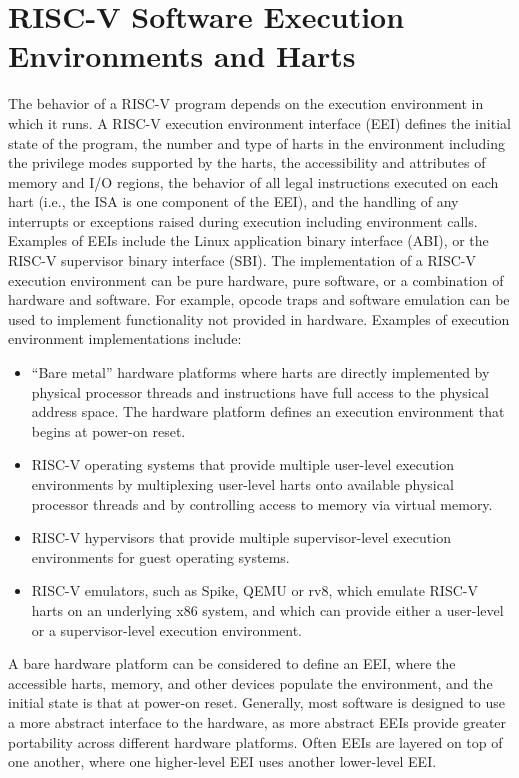 \section{RISC-V Software Execution Environments and Harts}

The behavior of a RISC-V program depends on the execution environment
in which it runs.  A RISC-V execution environment interface (EEI)
defines the initial state of the program, the number and type of harts
in the environment including the privilege modes supported by the
harts, the accessibility and attributes of memory and I/O regions, the
behavior of all legal instructions executed on each hart (i.e., the
ISA is one component of the EEI), and the handling of any interrupts
or exceptions raised during execution including environment calls.
Examples of EEIs include the Linux application binary interface (ABI),
or the RISC-V supervisor binary interface (SBI).  The implementation
of a RISC-V execution environment can be pure hardware, pure software,
or a combination of hardware and software.  For example, opcode traps
and software emulation can be used to implement functionality not
provided in hardware.  Examples of execution environment
implementations include:
\begin{itemize}
  \item ``Bare metal'' hardware platforms where harts are directly
    implemented by physical processor threads and instructions have
    full access to the physical address space.  The hardware platform
    defines an execution environment that begins at power-on reset.
  \item RISC-V operating systems that provide multiple user-level
    execution environments by multiplexing user-level harts onto
    available physical processor threads and by controlling access to
    memory via virtual memory.
  \item RISC-V hypervisors that provide multiple supervisor-level
    execution environments for guest operating systems.
  \item RISC-V emulators, such as Spike, QEMU or rv8, which emulate
    RISC-V harts on an underlying x86 system, and which can provide
    either a user-level or a supervisor-level execution environment.
\end{itemize}

\begin{commentary}
  A bare hardware platform can be considered to define an EEI, where
  the accessible harts, memory, and other devices populate the
  environment, and the initial state is that at power-on reset.
  Generally, most software is designed to use a more abstract
  interface to the hardware, as more abstract EEIs provide greater
  portability across different hardware platforms.  Often EEIs are
  layered on top of one another, where one higher-level EEI uses
  another lower-level EEI.
\end{commentary}


